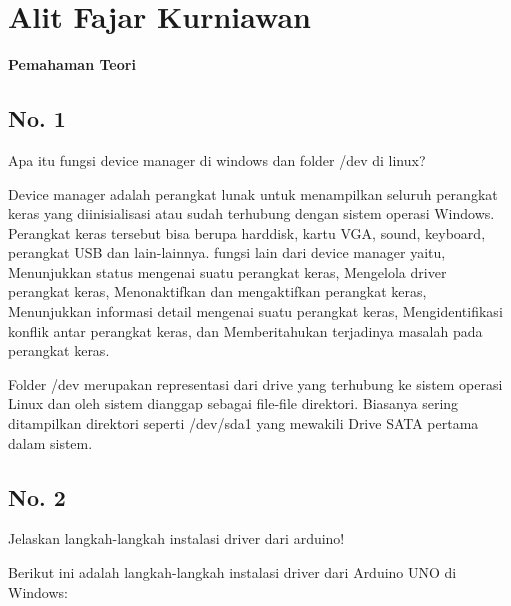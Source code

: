 \section{Alit Fajar Kurniawan}
{\Large \textbf{Pemahaman Teori}}
\subsection{No. 1}
Apa itu fungsi device manager di windows dan folder /dev di linux?

	\hfill \break
	Device manager adalah perangkat lunak untuk menampilkan seluruh perangkat keras yang diinisialisasi atau sudah terhubung dengan sistem operasi Windows. Perangkat keras tersebut bisa berupa harddisk, kartu VGA, sound, keyboard, perangkat USB dan lain-lainnya. fungsi lain dari device manager yaitu, Menunjukkan status mengenai suatu perangkat keras,
	Mengelola driver perangkat keras, Menonaktifkan dan mengaktifkan perangkat keras, Menunjukkan informasi detail mengenai suatu perangkat keras, Mengidentifikasi konflik antar perangkat keras, dan Memberitahukan terjadinya masalah pada perangkat keras.

	\hfill \break
	Folder /dev merupakan representasi dari drive yang terhubung ke sistem operasi Linux dan oleh sistem dianggap sebagai file-file direktori. Biasanya sering ditampilkan direktori seperti /dev/sda1 yang mewakili Drive SATA pertama dalam sistem.

\subsection{No. 2}
Jelaskan langkah-langkah instalasi driver dari arduino!

	\hfill \break
	Berikut ini adalah langkah-langkah instalasi driver dari Arduino UNO di Windows:

